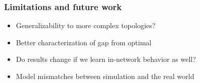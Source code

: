 \documentclass[svgnames]{beamer}
\begin{document}
\begin{Large}
\begin{frame}
\frametitle{Limitations and future work}
\begin{itemize}
\item Generalizability to more complex topologies?
\item Better characterization of gap from optimal
\item Do results change if we learn in-network behavior as well?
\item Model mismatches between simulation and the real world
\end{itemize}
\end{frame}
\end{Large}
\end{document}

